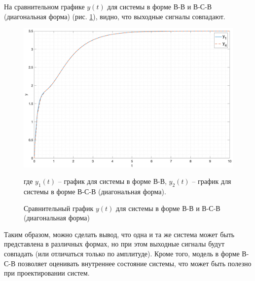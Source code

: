 На сравнительном графике $y(t)$ для системы в форме В-В и В-С-В (диагональная форма) (рис. \ref{fig:cmp_sys1_sys4}), видно, 
что выходные сигналы совпадают.

\begin{figure}[ht!]
    \centering
    \includegraphics[width=\textwidth]{media/cmp_sys1_sys4.png}
    \caption{Сравнительный график $y(t)$ для системы в форме В-В и В-С-В (диагональная форма)}
    \label{fig:cmp_sys1_sys4}
    где $y_1(t)$ -- график для системы в форме В-В, $y_2(t)$ -- график для системы в форме В-С-В (диагональная форма).
\end{figure}

\FloatBarrier

Таким образом, можно сделать вывод, что одна и та же система может быть представлена в различных формах, но при этом
выходные сигналы будут совпадать (или отличаться только по амплитуде). Кроме того, модель в форме В-С-В позволяет 
оценивать внутреннее состояние системы, что может быть полезно при проектировании систем. 

